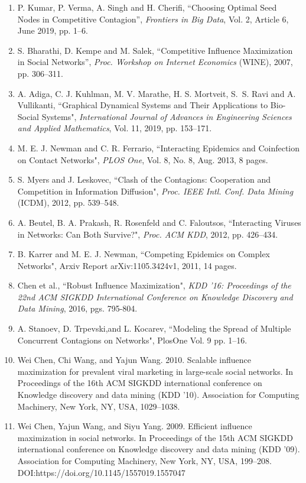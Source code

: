\documentclass[11pt]{article}
\begin{document}
\begin{enumerate}
\item   P. Kumar, P. Verma, A. Singh and H. Cherifi,
``Choosing Optimal Seed Nodes in Competitive Contagion”, 
\emph{Frontiers in Big Data}, Vol. 2, Article 6, June 2019, pp. 1--6.

\item S. Bharathi, D. Kempe and M. Salek, ``Competitive Influence 
Maximization in Social Networks”, \emph{Proc. Workshop on Internet Economics}
(WINE), 2007, pp. 306--311.

\item A. Adiga, C. J. Kuhlman, M. V. Marathe, H. S. Mortveit, 
S.~S. Ravi and A. Vullikanti, ``Graphical Dynamical Systems and Their
Applications to Bio-Social Systems", \emph{International Journal of Advances
in Engineering Sciences and Applied Mathematics}, Vol. 11, 2019, pp. 153--171.

\item M. E. J. Newman and C. R. Ferrario, ``Interacting Epidemics and 
Coinfection on Contact Networks", \emph{PLOS One}, Vol. 8, No. 8, Aug. 2013,
8 pages.

\item S. Myers and J. Leskovec, ``Clash of the Contagions: Cooperation and 
Competition in Information Diffusion", \emph{Proc. IEEE Intl. Conf. Data Mining}
(ICDM), 2012, pp. 539--548.

\item A. Beutel, B. A. Prakash, R. Rosenfeld and C. Faloutsos,
``Interacting Viruses in Networks: Can Both Survive?", 
\emph{Proc. ACM KDD}, 2012, pp. 426--434.

\item B. Karrer and M. E. J. Newman, ``Competing Epidemics on Complex Networks",
Arxiv Report arXiv:1105.3424v1, 2011, 14 pages.

\item Chen et al., ``Robust Influence Maximization", \emph{KDD '16: Proceedings of the 22nd ACM SIGKDD International Conference on Knowledge Discovery and Data Mining}, 2016, pgs. 795-804.

\item A. Stanoev, D. Trpevski,and L. Kocarev, ``Modeling the Spread of Multiple Concurrent Contagions on Networks", PlosOne Vol. 9 pp. 1--16.

\item Wei Chen, Chi Wang, and Yajun Wang. 2010. Scalable influence maximization for prevalent viral marketing in large-scale social networks. In Proceedings of the 16th ACM SIGKDD international conference on Knowledge discovery and data mining (KDD ’10). Association for Computing Machinery, New York, NY, USA, 1029–1038. 

\item Wei Chen, Yajun Wang, and Siyu Yang. 2009. Efficient influence maximization in social networks. In Proceedings of the 15th ACM SIGKDD international conference on Knowledge discovery and data mining (KDD ’09). Association for Computing Machinery, New York, NY, USA, 199–208. DOI:https://doi.org/10.1145/1557019.1557047  

\end{enumerate}
\end{document}
